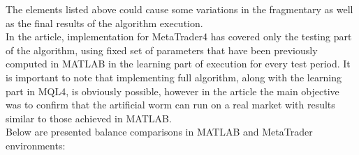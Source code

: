 \documentclass[runningheads,a4paper]{llncs}
\begin{document}
The elements listed above could cause some variations in the fragmentary as well as the final results of the algorithm execution.\\

In the article, implementation for MetaTrader4 has covered only the testing part of the algorithm, using fixed set of parameters that have been previously computed in MATLAB in the learning part of execution for every test period. It is important to note that implementing full algorithm, along with the learning part in MQL4, is obviously possible, however in the article the main objective was to confirm that the artificial worm can run on a real market with results similar to those achieved in MATLAB.\\

Below are presented balance comparisons in MATLAB and MetaTrader environments:
\end{document}
